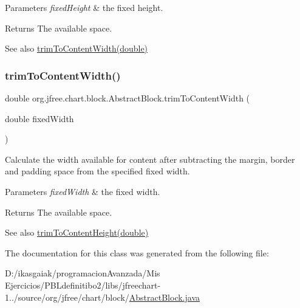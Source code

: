 \begin{DoxyParams}{Parameters}
{\em fixed\+Height} & the fixed height.\\
\hline
\end{DoxyParams}
\begin{DoxyReturn}{Returns}
The available space.
\end{DoxyReturn}
\begin{DoxySeeAlso}{See also}
\mbox{\hyperlink{classorg_1_1jfree_1_1chart_1_1block_1_1_abstract_block_a23ecdd7cb4d871588c23657c7d39e54c}{trim\+To\+Content\+Width(double)}} 
\end{DoxySeeAlso}
\mbox{\label{classorg_1_1jfree_1_1chart_1_1block_1_1_abstract_block_a23ecdd7cb4d871588c23657c7d39e54c}} 
\subsubsection{\texorpdfstring{trim\+To\+Content\+Width()}{trimToContentWidth()}}
{\footnotesize\ttfamily double org.\+jfree.\+chart.\+block.\+Abstract\+Block.\+trim\+To\+Content\+Width (\begin{DoxyParamCaption}\item[{double}]{fixed\+Width }\end{DoxyParamCaption})\hspace{0.3cm}{\ttfamily [protected]}}

Calculate the width available for content after subtracting the margin, border and padding space from the specified fixed width.


\begin{DoxyParams}{Parameters}
{\em fixed\+Width} & the fixed width.\\
\hline
\end{DoxyParams}
\begin{DoxyReturn}{Returns}
The available space.
\end{DoxyReturn}
\begin{DoxySeeAlso}{See also}
\mbox{\hyperlink{classorg_1_1jfree_1_1chart_1_1block_1_1_abstract_block_ab26a8b24e4b47a2d9d4843d04f83c137}{trim\+To\+Content\+Height(double)}} 
\end{DoxySeeAlso}


The documentation for this class was generated from the following file\+:\begin{DoxyCompactItemize}
\item 
D\+:/ikasgaiak/programacion\+Avanzada/\+Mis Ejercicios/\+P\+B\+Ldefinitibo2/libs/jfreechart-\/1../source/org/jfree/chart/block/\mbox{\hyperlink{_abstract_block_8java}{Abstract\+Block.\+java}}\end{DoxyCompactItemize}
